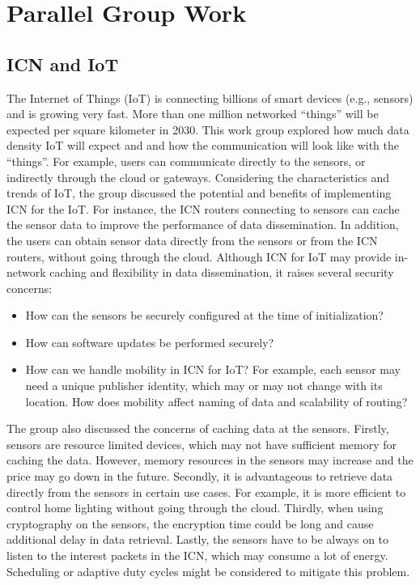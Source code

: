 \section{Parallel Group Work} \label{sec:group-work}
\subsection{ICN and IoT}

The Internet of Things (IoT) is connecting billions of smart devices (e.g., sensors) and is growing very fast. More than one million networked ``things'' will be expected per square kilometer in 2030. This work group explored how much data density IoT will expect and and how the communication will look like with the ``things''. For example, users can communicate directly to the sensors, or indirectly through the cloud or gateways. Considering the characteristics and trends of IoT, the group discussed the potential and benefits of implementing ICN for the IoT. For instance, the ICN routers connecting to sensors can cache the sensor data to improve the performance of data dissemination. In addition, the users can obtain sensor data directly from the sensors or from the ICN routers, without going through the cloud. Although ICN for IoT may provide in-network caching and flexibility in data dissemination, it raises several security concerns:

\begin{itemize}
\item How can the sensors be securely configured at the time of initialization?
\item How can software updates be performed securely?
\item How can we handle mobility in ICN for IoT? For example, each sensor may need a unique publisher identity, which may or may not change with its location. How does mobility affect naming of data and scalability of routing?
\end{itemize}

The group also discussed the concerns of caching data at the sensors. Firstly, sensors are resource limited devices, which may not have sufficient memory for caching the data. However, memory resources in the sensors may increase and the price may go down in the future. Secondly, it is advantageous to retrieve data directly from the sensors in certain use cases. For example, it is more efficient to control home lighting without going through the cloud. Thirdly, when using cryptography on  the sensors, the encryption time could be long and cause additional delay in data retrieval. Lastly, the sensors have to be always on to listen to the interest packets in the ICN, which may consume a lot of energy. Scheduling or adaptive duty cycles might be considered to mitigate this problem.

